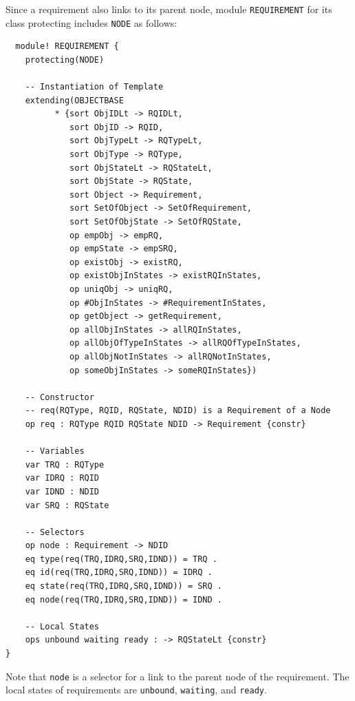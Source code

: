 \documentclass[12pt]{report}
\begin{document}
Since a requirement also links to its parent node, module {\tt REQUIREMENT} for
its class protecting includes {\tt NODE} as follows:
\small
\begin{verbatim}
  module! REQUIREMENT {
    protecting(NODE)
  
    -- Instantiation of Template
    extending(OBJECTBASE
          * {sort ObjIDLt -> RQIDLt,
             sort ObjID -> RQID,
             sort ObjTypeLt -> RQTypeLt,
             sort ObjType -> RQType,
             sort ObjStateLt -> RQStateLt,
             sort ObjState -> RQState,
             sort Object -> Requirement,
             sort SetOfObject -> SetOfRequirement,
             sort SetOfObjState -> SetOfRQState,
             op empObj -> empRQ,
             op empState -> empSRQ,
             op existObj -> existRQ,
             op existObjInStates -> existRQInStates,
             op uniqObj -> uniqRQ,
             op #ObjInStates -> #RequirementInStates,
             op getObject -> getRequirement,
             op allObjInStates -> allRQInStates,
             op allObjOfTypeInStates -> allRQOfTypeInStates,
             op allObjNotInStates -> allRQNotInStates,
             op someObjInStates -> someRQInStates})
  
    -- Constructor
    -- req(RQType, RQID, RQState, NDID) is a Requirement of a Node
    op req : RQType RQID RQState NDID -> Requirement {constr}
  
    -- Variables
    var TRQ : RQType
    var IDRQ : RQID
    var IDND : NDID
    var SRQ : RQState
  
    -- Selectors
    op node : Requirement -> NDID
    eq type(req(TRQ,IDRQ,SRQ,IDND)) = TRQ .
    eq id(req(TRQ,IDRQ,SRQ,IDND)) = IDRQ .
    eq state(req(TRQ,IDRQ,SRQ,IDND)) = SRQ .
    eq node(req(TRQ,IDRQ,SRQ,IDND)) = IDND .
  
    -- Local States
    ops unbound waiting ready : -> RQStateLt {constr}
}
\end{verbatim}
\normalsize
Note that {\tt node} is a selector for a link to the parent node of
the requirement. The local states of requirements are {\tt unbound},
{\tt waiting}, and {\tt ready}.
\end{document}

